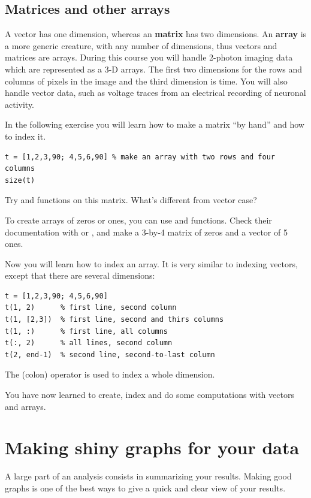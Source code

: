 \documentclass{article}
\begin{document}
\subsection{Matrices and other arrays}

A vector has one dimension, whereas an \textbf{matrix} has two dimensions.
An \textbf{array} is a more generic creature, with any number of dimensions, thus vectors and matrices are arrays.
During this course you will handle 2-photon imaging data which are represented as a 3-D arrays.
The first two dimensions for the rows and columns of pixels in the image and the third dimension is time.
You will also handle vector data, such as voltage traces from an electrical recording of neuronal activity.

In the following exercise you will learn how to make a matrix ``by hand'' and how to index it.
\begin{lstlisting}
t = [1,2,3,90; 4,5,6,90] % make an array with two rows and four columns
size(t)
\end{lstlisting}
Try  and  functions on this matrix.
What's different from vector case?

To create arrays of zeros or ones, you can use  and  functions.
Check their documentation with  or , and make a 3-by-4 matrix of zeros and a vector of 5 ones.

Now you will learn how to index an array.
It is very similar to indexing vectors, except that there are several dimensions:
\begin{lstlisting}
t = [1,2,3,90; 4,5,6,90]
t(1, 2)      % first line, second column
t(1, [2,3])  % first line, second and thirs columns
t(1, :)      % first line, all columns
t(:, 2)      % all lines, second column
t(2, end-1)  % second line, second-to-last column
\end{lstlisting}
The \mcode{:} (colon) operator is used to index a whole dimension.

You have now learned to create, index and do some computations with vectors and arrays.

\section{Making shiny graphs for your data}

A large part of an analysis consists in summarizing your results.
Making good graphs is one of the best ways to give a quick and clear view of your results.
\end{document}

